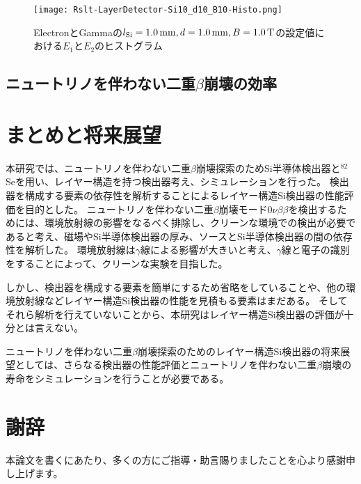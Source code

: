 \documentclass[a4paper,10pt]{jreport}
\begin{document}
\begin{figure}[H]
	\center
	\texttt{[image: Rslt-LayerDetector-Si10\_d10\_B10-Histo.png]}
	\caption{ElectronとGammaの$l_{\rm{Si}}=\SI{1.0}{mm}, d=\SI{1.0}{mm}, B=\SI{1.0}{T}$の設定値における$E_1$と$E_2$のヒストグラム}
	\label{Rslt-LayerDetector-Si05_d05_B00-Histo}
\end{figure}





\section{ニュートリノを伴わない二重$\beta$崩壊の効率}





\chapter*{まとめと将来展望}

本研究では、ニュートリノを伴わない二重$\beta$崩壊探索のためSi半導体検出器と$^{82}$Seを用い、レイヤー構造を持つ検出器考え、シミュレーションを行った。
検出器を構成する要素の依存性を解析することによるレイヤー構造Si検出器の性能評価を目的とした。
ニュートリノを伴わない二重$\beta$崩壊モード$0\nu\beta\beta$を検出するためには、環境放射線の影響をなるべく排除し、クリーンな環境での検出が必要であると考え、磁場やSi半導体検出器の厚み、ソースとSi半導体検出器の間の依存性を解析した。
環境放射線は$\gamma$線による影響が大きいと考え、$\gamma$線と電子の識別をすることによって、クリーンな実験を目指した。

しかし、検出器を構成する要素を簡単にするため省略をしていることや、他の環境放射線などレイヤー構造Si検出器の性能を見積もる要素はまだある。
そしてそれら解析を行えていないことから、本研究はレイヤー構造Si検出器の評価が十分とは言えない。

ニュートリノを伴わない二重$\beta$崩壊探索のためのレイヤー構造Si検出器の将来展望としては、さらなる検出器の性能評価とニュートリノを伴わない二重$\beta$崩壊の寿命をシミュレーションを行うことが必要である。



\chapter*{謝辞}

本論文を書くにあたり、多くの方にご指導・助言賜りましたことを心より感謝申し上げます。
\end{document}
